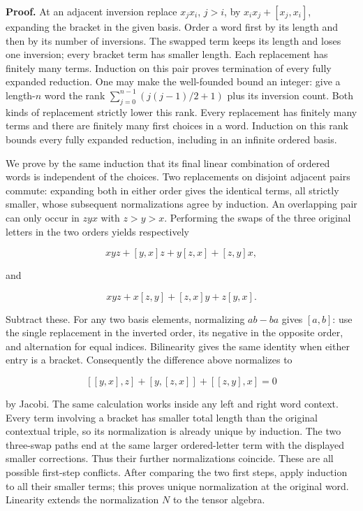 \documentclass[11pt,a4paper,openany]{report}
\begin{document}
\textbf{Proof.} At an adjacent inversion replace \(x_jx_i\), \(j>i\), by \(x_ix_j+[x_j,x_i]\), expanding the bracket in the given basis. Order a word first by its length and then by its number of inversions. The swapped term keeps its length and loses one inversion; every bracket term has smaller length. Each replacement has finitely many terms. Induction on this pair proves termination of every fully expanded reduction. One may make the well-founded bound an integer: give a length-\(n\) word the rank \(\sum_{j=0}^{n-1}(j(j-1)/2+1)\) plus its inversion count. Both kinds of replacement strictly lower this rank. Every replacement has finitely many terms and there are finitely many first choices in a word. Induction on this rank bounds every fully expanded reduction, including in an infinite ordered basis.

We prove by the same induction that its final linear combination of ordered words is independent of the choices. Two replacements on disjoint adjacent pairs commute: expanding both in either order gives the identical terms, all strictly smaller, whose subsequent normalizations agree by induction. An overlapping pair can only occur in \(zyx\) with \(z>y>x\). Performing the swaps of the three original letters in the two orders yields respectively

\[
xyz+[y,x]z+y[z,x]+[z,y]x,
\]

and

\[
xyz+x[z,y]+[z,x]y+z[y,x].
\]

Subtract these. For any two basis elements, normalizing \(ab-ba\) gives \([a,b]\): use the single replacement in the inverted order, its negative in the opposite order, and alternation for equal indices. Bilinearity gives the same identity when either entry is a bracket. Consequently the difference above normalizes to

\[
[[y,x],z]+[y,[z,x]]+[[z,y],x]=0
\]

by Jacobi. The same calculation works inside any left and right word context. Every term involving a bracket has smaller total length than the original contextual triple, so its normalization is already unique by induction. The two three-swap paths end at the same larger ordered-letter term with the displayed smaller corrections. Thus their further normalizations coincide. These are all possible first-step conflicts. After comparing the two first steps, apply induction to all their smaller terms; this proves unique normalization at the original word. Linearity extends the normalization \(N\) to the tensor algebra.
\end{document}
